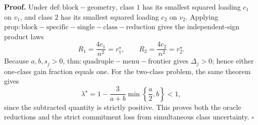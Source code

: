 \textbf{Proof.}
Under \(\mathrm{def:block-geometry}\), class \(1\) has its smallest squared loading \(c_1\) on \(v_1\), and class \(2\) has its smallest squared loading \(c_2\) on \(v_2\).  Applying \(\mathrm{prop:block-specific-single-class-reduction}\) gives the independent-sign product laws
\[
R_1=\frac{4c_1}{n^2}=r_1^\star,
\qquad
R_2=\frac{4c_2}{n^2}=r_2^\star. \tag{1}
\]
Because \(a,b,s_j>0\), \(\mathrm{thm:quadruple-menu-frontier}\) gives \(\Delta_j>0\); hence either one-class gain fraction equals one.  For the two-class problem, the same theorem gives
\[
\lambda^\star
=1-\frac3{a+b}\min\left\{\frac a2,b\right\}<1, \tag{2}
\]
since the subtracted quantity is strictly positive.  This proves both the oracle reductions and the strict commitment loss from simultaneous class uncertainty. \(\square\)